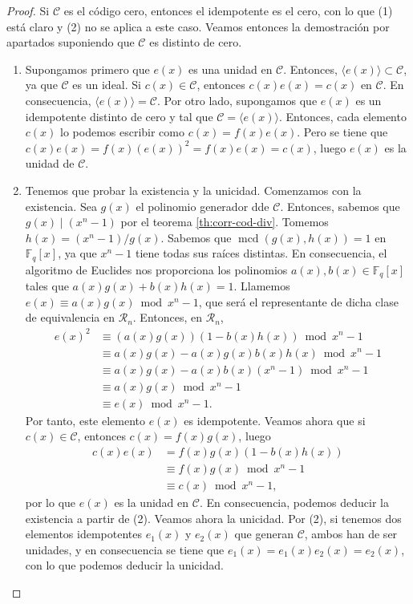 \begin{proof}
  Si \(\mathcal C\) es el código cero, entonces el idempotente es el cero, con lo que (1) está claro y (2) no se aplica a este caso. 
  Veamos entonces la demostración por apartados suponiendo que \(\mathcal C\) es distinto de cero.
  \begin{enumerate}
    \item Supongamos primero que \(e(x)\) es una unidad en \(\mathcal C\). 
    Entonces, \(\langle e(x)\rangle \subset \mathcal C\), ya que \(\mathcal C\) es un ideal.
    Si \(c(x) \in \mathcal C\), entonces \(c(x)e(x) = c(x)\) en \(\mathcal C\).
    En consecuencia, \(\langle e(x)\rangle = \mathcal C\).
    Por otro lado, supongamos que \(e(x)\) es un idempotente distinto de cero y tal que \(\mathcal C = \langle e(x)\rangle\).
    Entonces, cada elemento \(c(x)\) lo podemos escribir como \(c(x) = f(x)e(x)\).
    Pero se tiene que \(c(x)e(x) = f(x)(e(x))^2 = f(x)e(x) = c(x)\), luego \(e(x)\) es la unidad de \(\mathcal C\).
    \item Tenemos que probar la existencia y la unicidad.
    Comenzamos con la existencia.
    Sea \(g(x)\) el polinomio generador dde \(\mathcal C\).
    Entonces, sabemos que \(g(x) \mid (x^n - 1)\) por el teorema \ref{th:corr-cod-div}.
    Tomemos \(h(x) = (x^n - 1)/g(x)\).
    Sabemos que \(\operatorname{mcd}(g(x), h(x)) = 1\) en \(\mathbb F_q[x]\), ya que \(x^n - 1\) tiene todas sus raíces distintas.
    En consecuencia, el algoritmo de Euclides %
    nos proporciona los polinomios \(a(x),b(x) \in \mathbb F_q[x]\) tales que \(a(x)g(x) + b(x)h(x) = 1\).
    Llamemos \(e(x) \equiv a(x)g(x) \bmod x^n - 1\), que será el representante de dicha clase de equivalencia en \(\mathcal R_n\).
    Entonces, en \(\mathcal R_n\),
    \begin{align*}
      e(x)^2 &\equiv (a(x)g(x))(1 - b(x)h(x)) \bmod x^n - 1\\
        &\equiv a(x)g(x) - a(x)g(x)b(x)h(x) \bmod x^n - 1\\
        &\equiv a(x)g(x) - a(x)b(x)(x^n - 1) \bmod x^n - 1\\
        &\equiv a(x)g(x) \bmod x^n - 1\\
        &\equiv e(x) \bmod x^n - 1.
    \end{align*}
    Por tanto, este elemento \(e(x)\) es idempotente.
    Veamos ahora que si \(c(x) \in \mathcal C\), entonces \(c(x) = f(x)g(x)\), luego
    \begin{align*}
      c(x)e(x) &= f(x)g(x)(1 - b(x)h(x))\\
        &\equiv f(x)g(x) \bmod x^n - 1\\
        &\equiv c(x) \bmod x^n - 1,
    \end{align*}
    por lo que \(e(x)\) es la unidad en \(\mathcal C\).
    En consecuencia, podemos deducir la existencia a partir de (2).
    Veamos ahora la unicidad. Por (2), si tenemos dos elementos idempotentes \(e_1(x)\) y \(e_2(x)\) que generan \(\mathcal C\), ambos han de ser unidades, y en consecuencia se tiene que \(e_1(x) = e_1(x)e_2(x) = e_2(x)\), con lo que podemos deducir la unicidad.
  \end{enumerate}
\end{proof}

